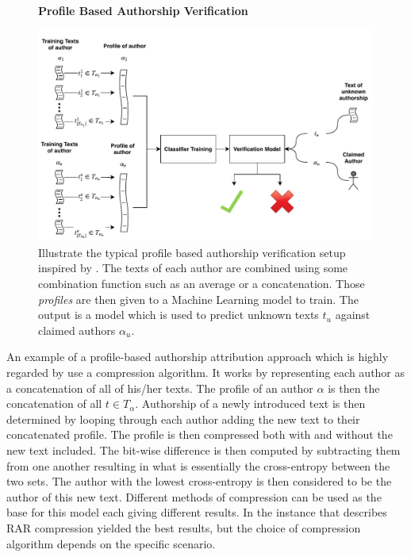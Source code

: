 \begin{figure}[htb]
    \centering
    \textbf{Profile Based Authorship Verification}\par\medskip
    \includegraphics[width=\textwidth]{./pictures/method/profile_based}
    \caption{Illustrate the typical profile based authorship verification setup
    inspired by \citet{stamatos2009}. The texts of each author are combined
    using some combination function such as an average or a concatenation. Those
    \textit{profiles} are then given to a Machine Learning model to train. The
    output is a model which is used to predict unknown texts $t_u$ against
    claimed authors $\alpha_u$.}
    \label{fig:profile_based}
\end{figure}

An example of a profile-based authorship attribution approach which is highly
regarded by \citet{stamatos2009} use a compression algorithm. It works by
representing each author as a concatenation of all of his/her texts. The profile
of an author $\alpha$ is then the concatenation of all $t \in T_\alpha$.
Authorship of a newly introduced text is then determined by looping through each
author adding the new text to their concatenated profile. The profile is then
compressed both with and without the new text included. The bit-wise difference
is then computed by subtracting them from one another resulting in what is
essentially the cross-entropy between the two sets. The author with the lowest
cross-entropy is then considered to be the author of this new text. Different
methods of compression can be used as the base for this model each giving
different results. In the instance that \citet{stamatos2009} describes RAR
compression yielded the best results, but the choice of compression algorithm
depends on the specific scenario.

